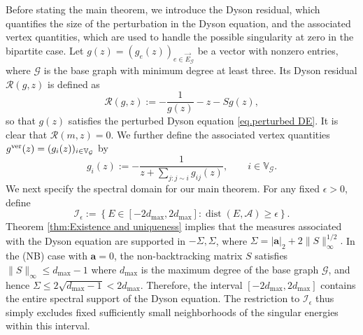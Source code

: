 \documentclass[11pt,twoside, a4paper]{article}
\numberwithin{equation}{section}
\numberwithin{figure}{section}
\theoremstyle{plain} %
\theoremstyle{definition}
\theoremstyle{remark}
\newcommand{\1} {\mspace{1 mu}}
\newcommand{\2} {\mspace{2 mu}}
\DeclareMathOperator{\dist}{dist}
\begin{document}
Before stating the main theorem, we introduce
the Dyson residual, which quantifies the size of the perturbation in the Dyson equation, and the associated vertex quantities, which are used to handle the possible singularity at zero in the bipartite case.
Let $g(z)=(g_e(z))_{e\in\vec E_{\mathcal G}}$ be a vector with
nonzero entries, where $\mathcal G$ is the base graph with minimum degree at least three. Its Dyson residual $\mathcal R(g,z)$ is
defined as 
\begin{equation}\label{eq.Dyson-residual}
    \mathcal{R}(g,z):=-\frac{1}{g(z)}-z-Sg(z),
\end{equation}
so that $g(z)$ satisfies the perturbed Dyson equation \eqref{eq.perturbed DE}. It is clear that $\mathcal{R}(m,z)=0$.
We further define the associated vertex quantities
$g^{\rm ver}(z)=(g_i(z))_{i\in\mathbb V_{\mathcal G}}$ by
\begin{equation}\label{eq:q-vertex-reconstruction}
    g_i(z)
    :=
    -\frac{1}{z+\sum_{j:j\sim i}g_{ij}(z)},
    \qquad i\in\mathbb V_{\mathcal{G}}.
\end{equation}
We next specify the spectral domain for our main theorem.
For any fixed $\epsilon>0$, define
\[
    \mathcal I_\epsilon
    :=
    \left\{
    E\in[-2d_{\max},2d_{\max}]:
    \dist(E,\mathcal A)
    \ge\epsilon
    \right\}.
\]
Theorem \ref{thm:Existence and uniqueness} implies that the measures associated with the Dyson equation
are supported in $-\Sigma,\Sigma$, where
$
    \Sigma=|\mathbf a|_2+2\|S\|_\infty^{1/2}.
$
In the (NB) case with $\mathbf a=0$, the non-backtracking
matrix $S$ satisfies $\|S\|_\infty\le d_{\max}-1$ where $d_{\max}$ is the maximum degree of the base graph $\mathcal G$, and hence
$
    \Sigma\le 2\sqrt{d_{\max}-1}<2d_{\max}.
$
Therefore, the interval $[-2d_{\max},2d_{\max}]$ contains
the entire spectral support of the Dyson equation.
The restriction to $\mathcal I_\epsilon$ thus simply excludes
fixed sufficiently small neighborhoods of the singular energies within this
interval.
\end{document}
